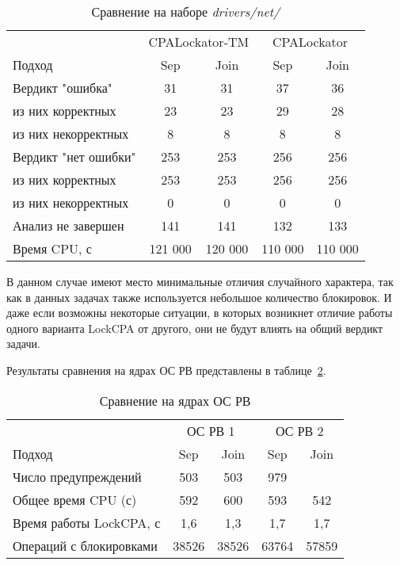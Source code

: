   \begin{table}[h]\footnotesize \centering
    \caption{Сравнение на наборе \textit{drivers/net/}}
  	\label{table-drivers-lock-merge}
    \begin{tabular}{ | l | c | c | c | c | }
      \hline
      		& 		\multicolumn{2}{|c|}{CPALockator-TM} 	& \multicolumn{2}{|c|}{CPALockator}  \\
      Подход         				& Sep 		& Join 		& Sep 		& Join   	\\ \hline
      Вердикт "ошибка" 				& 31   		& 31   		& 37   		& 36   		\\ 
  \hspace{0.5cm} из них корректных 	& 23 		& 23 		& 29   		& 28     	\\ 
  \hspace{0.5cm} из них некорректных & 8 		& 8 		& 8   		& 8     	\\ \hline
      Вердикт "нет ошибки"  		& 253    	& 253   	& 256    	& 256      	\\ 
  \hspace{0.5cm} из них корректных 	& 253 		& 253   	& 256    	& 256     	\\
  \hspace{0.5cm} из них некорректных & 0 		& 0    		& 0     	& 0  		\\ \hline
      Анализ не завершен       		& 141    	& 141   	& 132    	& 133     	\\ \hline
      Время CPU, с   				& 121 000 	& 120 000 	& 110 000 	& 110 000   \\ 
      \hline
    \end{tabular}
  \end{table}

В данном случае имеют место минимальные отличия случайного характера, так как в данных задачах также используется небольшое количество блокировок. 
И даже если возможны некоторые ситуации, в которых возникнет отличие работы одного варианта LockCPA от другого, они не будут влиять на общий вердикт задачи.

Результаты сравнения на ядрах ОС РВ представлены в таблице~\ref{table-os-lock-merge}.

  \begin{table}[h]\footnotesize \centering
    \caption{Сравнение на ядрах ОС РВ}
  	\label{table-os-lock-merge}
    \begin{tabular}{ | l | c | c | c | c | }
      \hline
      		& 		\multicolumn{2}{|c|}{ОС РВ 1} & \multicolumn{2}{|c|}{ОС РВ 2}  \\
      Подход         					& Sep 	& Join 	& Sep 	& Join   	\\ \hline
      Число предупреждений				& 503   & 503   & 979   & \todo{918 ??}   	\\ 
  	  Общее время CPU (с) 				& 592 	& 600 	& 593   & 542     	\\ 
  \hspace{0.5cm} Время работы LockCPA, с & 1,6 	& 1,3 	& 1,7   & 1,7     	\\ \hline
   	  Операций с блокировками			& 38526 & 38526 & 63764 & 57859      	\\ 
      \hline
    \end{tabular}
  \end{table}

